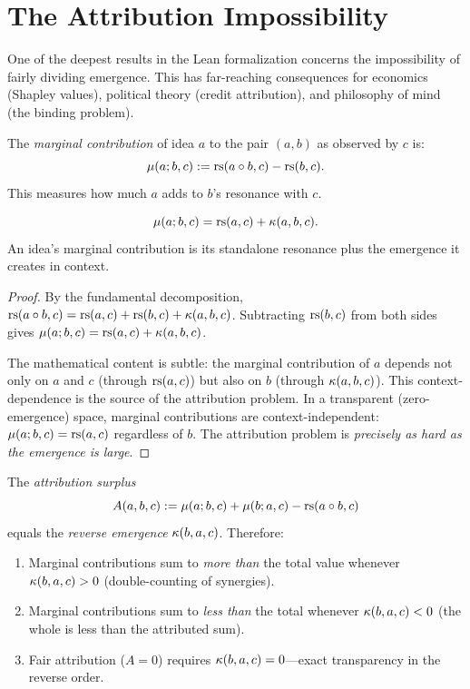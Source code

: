 \section{The Attribution Impossibility}

One of the deepest results in the Lean formalization concerns the
impossibility of fairly dividing emergence. This has far-reaching
consequences for economics (Shapley values), political theory (credit
attribution), and philosophy of mind (the binding problem).

\begin{definition}
\label{def:marginal-contrib}
The \emph{marginal contribution} of idea $a$ to the pair $(a, b)$ as
observed by $c$ is:
\[
\mu(a; b, c) := \mathrm{rs}(a \circ b, c) - \mathrm{rs}(b, c).
\]
This measures how much $a$ adds to $b$'s resonance with $c$.
\end{definition}

\begin{theorem}
\label{thm:marginal-decomp}
\[
\mu(a; b, c) = \mathrm{rs}(a, c) + \kappa(a, b, c).
\]
An idea's marginal contribution is its standalone resonance plus the
emergence it creates in context.
\end{theorem}

\begin{proof}
By the fundamental decomposition, $\mathrm{rs}(a \circ b, c) = \mathrm{rs}(a, c) + \mathrm{rs}(b, c)
+ \kappa(a, b, c)$. Subtracting $\mathrm{rs}(b, c)$ from both sides gives
$\mu(a; b, c) = \mathrm{rs}(a, c) + \kappa(a, b, c)$.

The mathematical content is subtle: the marginal contribution of $a$ depends
not only on $a$ and $c$ (through $\mathrm{rs}(a, c)$) but also on $b$ (through
$\kappa(a, b, c)$). This context-dependence is the source of the attribution
problem. In a transparent (zero-emergence) space, marginal contributions
are context-independent: $\mu(a; b, c) = \mathrm{rs}(a, c)$ regardless of $b$.
The attribution problem is \emph{precisely as hard as the emergence is
large}.
\end{proof}

\begin{theorem}
\label{thm:attribution-impossibility}
The \emph{attribution surplus}
\[
A(a, b, c) := \mu(a; b, c) + \mu(b; a, c) - \mathrm{rs}(a \circ b, c)
\]
equals the \emph{reverse emergence} $\kappa(b, a, c)$. Therefore:
\begin{enumerate}
\item Marginal contributions sum to \emph{more than} the total value whenever
$\kappa(b, a, c) > 0$ (double-counting of synergies).
\item Marginal contributions sum to \emph{less than} the total whenever
$\kappa(b, a, c) < 0$ (the whole is less than the attributed sum).
\item Fair attribution ($A = 0$) requires $\kappa(b, a, c) = 0$---exact
transparency in the reverse order.
\end{enumerate}
\end{theorem}

